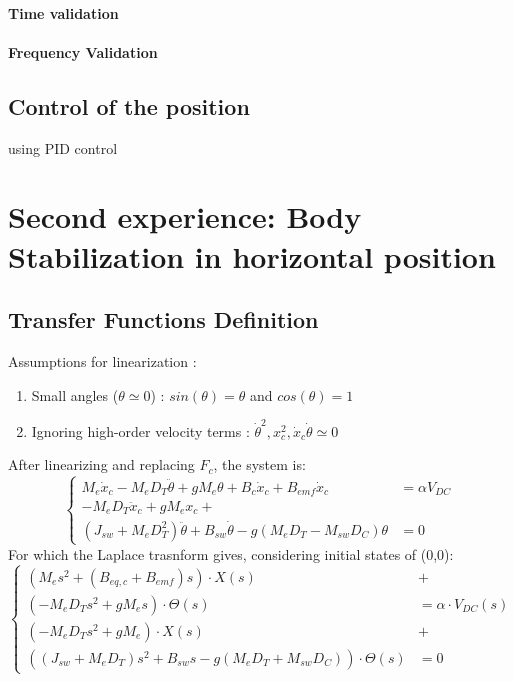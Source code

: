 \documentclass[11pt,a4paper]{article}
\begin{document}
\paragraph{Time validation}

\paragraph{Frequency Validation}

\subsection{Control of the position}

using PID control

\section{Second experience: Body Stabilization in horizontal position}

\subsection{Transfer Functions Definition}

Assumptions for linearization :
\begin{enumerate}
	\item Small angles ($\theta \simeq 0$) : $sin(\theta) = \theta$ and $cos(\theta) = 1$
	\item Ignoring high-order velocity terms : $\dot{\theta}^2, x_c^2, \dot{x}_c\dot{\theta} \simeq 0$
\end{enumerate}
After linearizing and replacing $F_c$, the system is:
\begin{equation}
	\left\{
	\begin{aligned}
		M_e\dot{x}_c - M_eD_T \ddot{\theta}
		+ gM_e \theta + B_c \dot{x}_c + B_{emf}\dot{x}_c & =  \alpha V_{DC} \\
		- M_e D_T \ddot{x}_c + gM_ex_c +                                    \\ (J_{sw} + M_eD^2_T)\ddot{\theta} + B_{sw} \dot{\theta} - g(M_eD_T - M_{sw}D_C)\theta &= 0
	\end{aligned}
	\right.
\end{equation}
For which the Laplace trasnform gives, considering initial states of (0,0):
\begin{equation}
	\left\{
	\begin{aligned}
		(M_e s^2 + (B_{eq,c} + B_{emf})s) \cdot X(s)                                & +                         \\
		(- M_e D_T s^2 + g M_e s) \cdot \Theta (s)                                  & =  \alpha \cdot V_{DC}(s) \\
		(-M_e D_T s^2 + g M_e) \cdot X(s)                                           & +                         \\
		( (J_{sw} + M_e D_T)s^2 + B_{sw}s - g(M_eD_T + M_{sw}D_C)) \cdot \Theta (s) & = 0
	\end{aligned}
	\right.
\end{equation}
\end{document}

